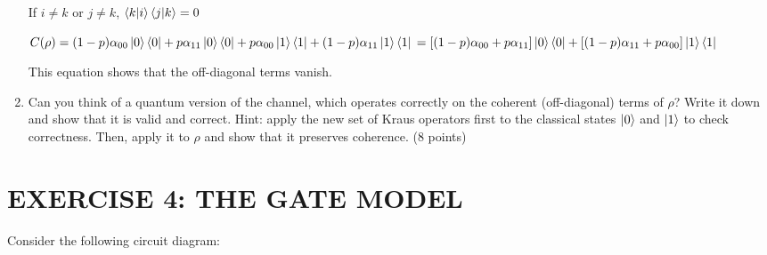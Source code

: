 \documentclass{article}
\begin{document}
\begin{enumerate}
          If $i\neq k$ or $j\neq k$, $\braket{k|i}\braket{j|k}=0$

          $C(\rho)=(1-p)\alpha_{00}\ket{0}\bra{0}+p\alpha_{11}\ket{0}\bra{0}+p\alpha_{00}\ket{1}\bra{1}+(1-p)\alpha_{11}\ket{1}\bra{1}
              \\=[(1-p)\alpha_{00}+p\alpha_{11}]\ket{0}\bra{0}+[(1-p)\alpha_{11}+p\alpha_{00}]\ket{1}\bra{1}
          $

          This equation shows that the off-diagonal terms vanish.


    \item Can you think of a quantum version of the channel, which operates correctly on the coherent (off-diagonal) terms of $\rho$? Write it down and show that it is valid and correct. Hint: apply the new set of Kraus operators first to the classical states $\ket{0}$ and $\ket{1}$ to check correctness. Then, apply it to $\rho$ and show that it preserves coherence. (8 points)



\end{enumerate}

\section{EXERCISE 4: THE GATE MODEL}
Consider the following circuit diagram:
\end{document}
